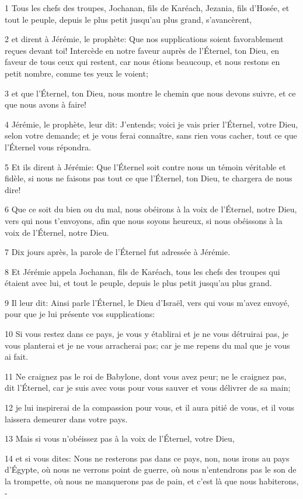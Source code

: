 \par 1 Tous les chefs des troupes, Jochanan, fils de Karéach, Jezania, fils d'Hosée, et tout le peuple, depuis le plus petit jusqu'au plus grand, s'avancèrent,
\par 2 et dirent à Jérémie, le prophète: Que nos supplications soient favorablement reçues devant toi! Intercède en notre faveur auprès de l'Éternel, ton Dieu, en faveur de tous ceux qui restent, car nous étions beaucoup, et nous restons en petit nombre, comme tes yeux le voient;
\par 3 et que l'Éternel, ton Dieu, nous montre le chemin que nous devons suivre, et ce que nous avons à faire!
\par 4 Jérémie, le prophète, leur dit: J'entends; voici je vais prier l'Éternel, votre Dieu, selon votre demande; et je vous ferai connaître, sans rien vous cacher, tout ce que l'Éternel vous répondra.
\par 5 Et ils dirent à Jérémie: Que l'Éternel soit contre nous un témoin véritable et fidèle, si nous ne faisons pas tout ce que l'Éternel, ton Dieu, te chargera de nous dire!
\par 6 Que ce soit du bien ou du mal, nous obéirons à la voix de l'Éternel, notre Dieu, vers qui nous t'envoyons, afin que nous soyons heureux, si nous obéissons à la voix de l'Éternel, notre Dieu.
\par 7 Dix jours après, la parole de l'Éternel fut adressée à Jérémie.
\par 8 Et Jérémie appela Jochanan, fils de Karéach, tous les chefs des troupes qui étaient avec lui, et tout le peuple, depuis le plus petit jusqu'au plus grand.
\par 9 Il leur dit: Ainsi parle l'Éternel, le Dieu d'Israël, vers qui vous m'avez envoyé, pour que je lui présente vos supplications:
\par 10 Si vous restez dans ce pays, je vous y établirai et je ne vous détruirai pas, je vous planterai et je ne vous arracherai pas; car je me repens du mal que je vous ai fait.
\par 11 Ne craignez pas le roi de Babylone, dont vous avez peur; ne le craignez pas, dit l'Éternel, car je suis avec vous pour vous sauver et vous délivrer de sa main;
\par 12 je lui inspirerai de la compassion pour vous, et il aura pitié de vous, et il vous laissera demeurer dans votre pays.
\par 13 Mais si vous n'obéissez pas à la voix de l'Éternel, votre Dieu,
\par 14 et si vous dites: Nous ne resterons pas dans ce pays, non, nous irons au pays d'Égypte, où nous ne verrons point de guerre, où nous n'entendrons pas le son de la trompette, où nous ne manquerons pas de pain, et c'est là que nous habiterons, -
